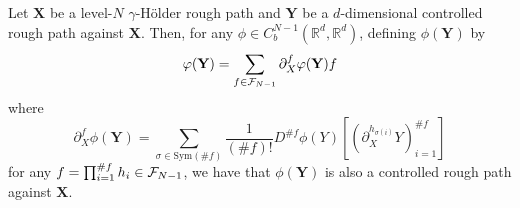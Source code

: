 \documentclass[11pt]{style/preprint}
\begin{document}
\begin{proposition}
  Let \(\mathbf{X}\) be a level-\(N\) \(\gamma\)-H\"older rough path and \(\mathbf{Y}\) 
  be a \(d\)-dimensional controlled rough path against \(\mathbf{X}\). 
  Then, for any \(\phi \in C^{N - 1}_b(\mathbb{R}^d, \mathbb{R}^d)\), defining \(\phi(\mathbf{Y})\) by
  \[\varphi(\mathbf{Y}) = \sum_{f \in {\mathcal F}_{N - 1}} \partial^f_X \varphi(\mathbf{Y}) f\]
  where 
  \[\partial^f_X \phi(\mathbf{Y}) = \sum_{\sigma \in \mathrm{Sym}(\# f)} \frac{1}{(\# f)!}D^{\# f} 
      \phi(Y)[(\partial^{h_{\sigma(i)}}_X Y)_{i = 1}^{\# f}]\]
  for any \(f = \prod_{i = 1}^{\# f} h_i \in {\mathcal F}_{N - 1}\), we have that \(\phi(\mathbf{Y})\) is 
  also a controlled rough path against \(\mathbf{X}\).
\end{proposition}
\end{document}
